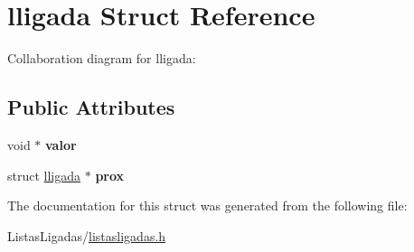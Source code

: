 \hypertarget{structlligada}{}\section{lligada Struct Reference}
\label{structlligada}


Collaboration diagram for lligada\+:
\subsection*{Public Attributes}
\begin{DoxyCompactItemize}
\item 
\mbox{\label{structlligada_a64449f0259fb452865ae4989609b7af8}} 
void $\ast$ {\bfseries valor}
\item 
\mbox{\label{structlligada_ae620cb307892f22905d79e0d5013f9e3}} 
struct \hyperlink{structlligada}{lligada} $\ast$ {\bfseries prox}
\end{DoxyCompactItemize}


The documentation for this struct was generated from the following file\+:\begin{DoxyCompactItemize}
\item 
Listas\+Ligadas/\hyperlink{listasligadas_8h}{listasligadas.\+h}\end{DoxyCompactItemize}

